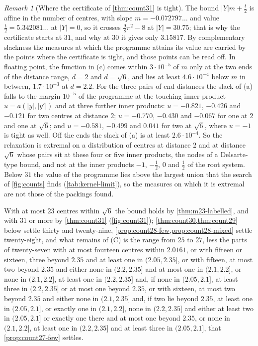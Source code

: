 \documentclass[11pt,reqno]{amsart}
\renewcommand{\_}{\origunderscore\allowbreak}
\numberwithin{equation}{section}
\theoremstyle{plain}
\theoremstyle{definition}
\theoremstyle{remark}
\newtheorem{remark}[thm]{Remark}
\begin{document}
\begin{remark}[Where the certificate of \cref{thm:count31} is tight]\label{rem:count31-tight}
The bound $|Y|m+\frac t2$ is affine in the number of centres, with slope
$m=-0.072797\ldots$ and value $\frac t2=5.342081\ldots$ at $|Y|=0$, so it
crosses $\frac98\pi^2-8$ at $|Y|=30.75$; that is why the certificate
starts at $31$, and why at $30$ it gives only $3.15817$. By complementary
slackness the measures at which the programme attains its value are carried
by the points where the certificate is tight, and those points can be read
off. In floating point, the function in (c) comes within $3\cdot10^{-5}$ of
$m$ only at the two ends of the distance range, $d=2$ and $d=\sqrt6$, and
lies at least $4.6\cdot10^{-4}$ below $m$ in between, $1.7\cdot10^{-3}$ at
$d=2.2$. For the three pairs of end distances the slack of (a) falls to the
margin $10^{-5}$ of the programme at the touching inner product
$u=a(|y|,|y'|)$ and at three further inner products: $u=-0.821$, $-0.426$
and $-0.121$ for two centres at distance $2$; $u=-0.770$, $-0.430$ and
$-0.067$ for one at $2$ and one at $\sqrt6$; and $u=-0.581$, $-0.499$ and
$0.041$ for two at $\sqrt6$, where $u=-1$ is tight as well. Off the ends
the slack of (a) is at least $2.6\cdot10^{-4}$. So the relaxation is
extremal on a distribution of centres at distance $2$ and at distance
$\sqrt6$ whose pairs sit at these four or five inner products, the nodes of
a Delsarte-type bound, and not at the inner products $-1$, $-\frac12$, $0$
and $\frac12$ of the root system. Below $31$ the value of the programme
lies above the largest union that the search of \cref{fig:counts} finds
(\cref{tab:kernel-limit}), so the measures on which it is extremal are not
those of the packings found.
\end{remark}

With at most $23$ centres within $\sqrt6$ the bound holds by
\cref{thm:m23-labelled}, and with $31$ or more by \cref{thm:count31}
(\cref{fig:count31}); \cref{thm:count30,thm:count29} below settle thirty and
twenty-nine, \cref{prop:count28-few,prop:count28-mixed} settle twenty-eight,
and what remains of (C) is the range from $25$ to $27$, less the parts of
twenty-seven with at most fourteen centres within $2.0161$, or with
fifteen or sixteen, three beyond $2.35$ and at least one in
$(2.05,2.35]$, or with fifteen, at most two beyond $2.35$ and either none in
$(2.2,2.35]$ and at most one in $(2.1,2.2]$, or none in $(2.1,2.2]$, at least one in $(2.2,2.35]$ and, if none in $(2.05,2.1]$, at least three in $(2.2,2.35]$ or at most one beyond $2.35$, or with sixteen, at most two beyond $2.35$
and either none in $(2.1,2.35]$ and, if two lie beyond $2.35$, at least one in $(2.05,2.1]$, or exactly one in $(2.1,2.2]$, none in $(2.2,2.35]$ and either at least two in $(2.05,2.1]$ or exactly one there and at most one beyond $2.35$, or none in $(2.1,2.2]$, at least one in $(2.2,2.35]$ and at least three in $(2.05,2.1]$, that \cref{prop:count27-few} settles.
\end{document}
